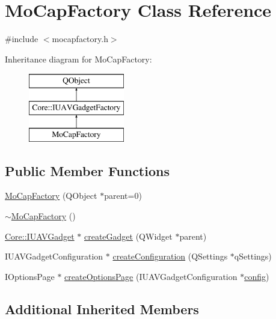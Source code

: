 \hypertarget{class_mo_cap_factory}{\section{Mo\-Cap\-Factory Class Reference}
\label{class_mo_cap_factory}
}


{\ttfamily \#include $<$mocapfactory.\-h$>$}

Inheritance diagram for Mo\-Cap\-Factory\-:\begin{figure}[H]
\begin{center}
\leavevmode
\includegraphics[height=3.000000cm]{class_mo_cap_factory}
\end{center}
\end{figure}
\subsection*{Public Member Functions}
\begin{DoxyCompactItemize}
\item 
\hyperlink{group___h_i_t_l_plugin_ga4c5fc1e339794bad8a5ad59687380db0}{Mo\-Cap\-Factory} (Q\-Object $\ast$parent=0)
\item 
\hyperlink{group___h_i_t_l_plugin_gae7570bd6937d0e589152551bd0ff5cf1}{$\sim$\-Mo\-Cap\-Factory} ()
\item 
\hyperlink{class_core_1_1_i_u_a_v_gadget}{Core\-::\-I\-U\-A\-V\-Gadget} $\ast$ \hyperlink{group___h_i_t_l_plugin_ga4a3cc25be4de282c2017c0e9db77e31d}{create\-Gadget} (Q\-Widget $\ast$parent)
\item 
I\-U\-A\-V\-Gadget\-Configuration $\ast$ \hyperlink{group___h_i_t_l_plugin_gacb27abd92b935f31e14c22c97795e4e6}{create\-Configuration} (Q\-Settings $\ast$q\-Settings)
\item 
I\-Options\-Page $\ast$ \hyperlink{group___h_i_t_l_plugin_gaea471065fa9f7d73e26e9b744f2bb117}{create\-Options\-Page} (I\-U\-A\-V\-Gadget\-Configuration $\ast$\hyperlink{deflate_8c_a4473b5227787415097004fd39f55185e}{config})
\end{DoxyCompactItemize}
\subsection*{Additional Inherited Members}


